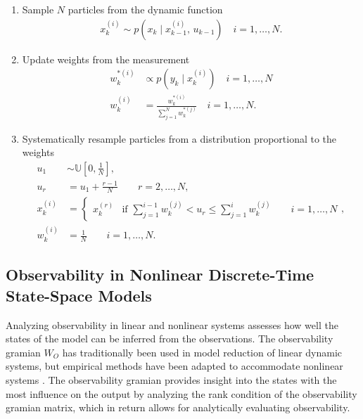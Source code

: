 \documentclass[nomenclature, english, bibtex]{kththesis}
\begin{document}
\begin{enumerate}
    \item Sample $N$ particles from the dynamic function
    \begin{align}
        x_k^{(i)} \sim p(x_k \mid x_{k-1}^{(i)},\,u_{k-1}) \quad i = 1,\dots, N.
    \end{align}
    \item Update weights from the measurement
    \begin{equation}
        \begin{aligned}
            w_k^{*(i)} &\propto p(y_k \mid x_k^{(i)})  \quad i = 1,\dots, N  \\
            w_k^{(i)} &= \frac{w_k^{*(i)}}{\sum_{j=1}^{N} w_k^{*(j)}} \quad i = 1,\dots, N .
        \end{aligned}
    \end{equation}
    \item Systematically resample particles from a distribution proportional to the weights
    \begin{equation}
        \begin{aligned}
            u_1 &\sim \mathbb{U} \left[0, \frac{1}{N}\right], \\
            u_r &= u_1 + \frac{r-1}{N} \qquad r=2, \dots, N, \\
            x_k^{(i)} &=
                \begin{cases}
                    x_k^{(r)} & \text{if } \sum_{j=1}^{i-1} w_k^{(j)} < u_r \leq \sum_{j=1}^{i} w_k^{(j)}  \qquad i=1,\dots, N 
                \end{cases}, \\
            w_k^{(i)} &= \frac{1}{N} \qquad i=1, \dots, N .
        \end{aligned}
    \end{equation}
\end{enumerate}

\subsection{Observability in Nonlinear Discrete-Time State-Space Models} \label{sec: obs}
Analyzing observability in linear and nonlinear systems assesses how well the states of the model can be inferred from the observations. The observability gramian $W_O$ has traditionally been used in model reduction of linear dynamic systems, but empirical methods have been adapted to accommodate nonlinear systems \cite{hahn_improved_2002}. The observability gramian provides insight into the states with the most influence on the output by analyzing the rank condition of the observability gramian matrix, which in return allows for analytically evaluating observability.
\end{document}
